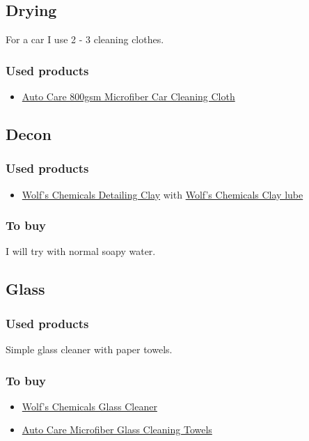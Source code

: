 \documentclass[12pt, a4paper, portrait]{article}
\begin{document}
\subsection{Drying}
For a car I use 2 - 3 cleaning clothes.
\subsubsection{Used products}
\begin{itemize}
\item{\href{https://www.aliexpress.com/store/product/1-pack-800gsm-45cmx38cm-Super-Thick-Plush-Microfiber-Car-Cleaning-Cloths-Car-Care-Microfibre-Wax-Polishing/1489256_32255040115.html}{Auto Care 800gsm Microfiber Car Cleaning Cloth}}
\end{itemize}

\subsection{Decon}
\subsubsection{Used products}
\begin{itemize}
\item{\href{http://wolfschemicals.com/shop/Clay-yellow}{Wolf's Chemicals Detailing Clay} with \href{http://wolfschemicals.com/shop/shop/shampoo/Clay_Lube}{Wolf's Chemicals Clay lube}}
\end{itemize}
\subsubsection{To buy}
I will try with normal soapy water.

\subsection{Glass}
\subsubsection{Used products}
Simple glass cleaner with paper towels.
\subsubsection{To buy}
\begin{itemize}
\item{\href{http://wolfschemicals.com/shop/glass_cleaner_500ml}{Wolf's Chemicals Glass Cleaner}}
\item{\href{https://www.aliexpress.com/item/8-Pack-Car-Microfiber-Glass-Cleaning-Towels-Stainless-Steel-Polishing-Shine-Cloth-Window-Windshield-Cloth-12/32255252214.html}{Auto Care Microfiber Glass Cleaning Towels}}
\end{itemize}
\end{document}
